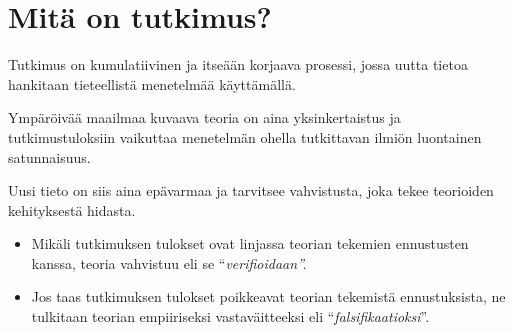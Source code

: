\documentclass[
]{report}
\begin{document}
\hypertarget{mituxe4-on-tutkimus}{%
\section{Mitä on tutkimus?}\label{mituxe4-on-tutkimus}}

Tutkimus on kumulatiivinen ja itseään korjaava prosessi, jossa uutta
tietoa hankitaan tieteellistä menetelmää käyttämällä.

Ympäröivää maailmaa kuvaava teoria on aina yksinkertaistus ja
tutkimustuloksiin vaikuttaa menetelmän ohella tutkittavan ilmiön
luontainen satunnaisuus.

Uusi tieto on siis aina epävarmaa ja tarvitsee vahvistusta, joka tekee
teorioiden kehityksestä hidasta.

\begin{itemize}
\item
  Mikäli tutkimuksen tulokset ovat linjassa teorian tekemien ennustusten
  kanssa, teoria vahvistuu eli se ``\emph{verifioidaan''.}
\item
  Jos taas tutkimuksen tulokset poikkeavat teorian tekemistä
  ennustuksista, ne tulkitaan teorian empiiriseksi vastaväitteeksi eli
  ``\emph{falsifikaatioksi}''.
\end{itemize}
\end{document}

